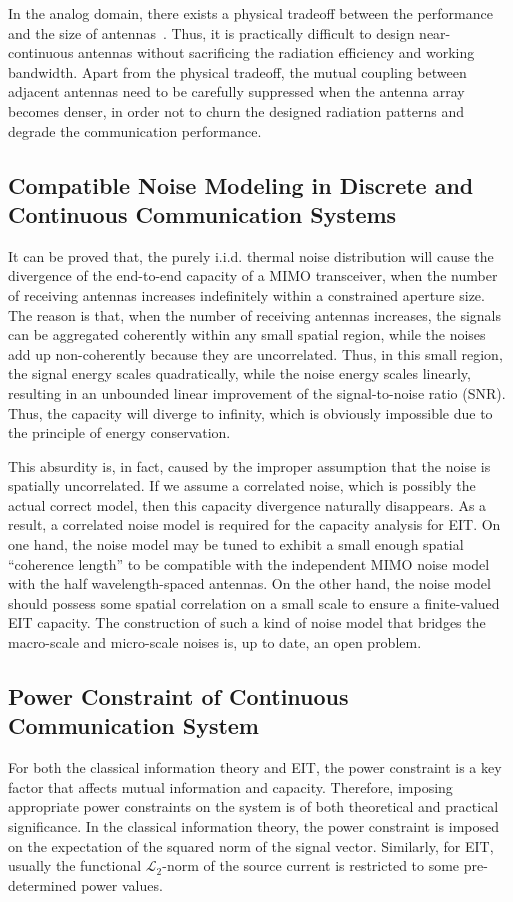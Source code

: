 \documentclass[journal,twocolumn]{IEEEtran}
\begin{document}
In the analog domain, there exists a physical tradeoff between the performance and the size of antennas~\cite{stratton2007electromagnetic}. Thus, it is practically difficult to design near-continuous antennas without sacrificing the radiation efficiency and working bandwidth. Apart from the physical tradeoff, the mutual coupling between adjacent antennas need to be carefully suppressed when the antenna array becomes denser, in order not to churn the designed radiation patterns and degrade the communication performance. 


\subsection{Compatible Noise Modeling in Discrete and Continuous Communication Systems}
It can be proved that, the purely i.i.d. thermal noise distribution will cause the divergence of the end-to-end capacity of a MIMO transceiver, when the number of receiving antennas increases indefinitely within a constrained aperture size. 
The reason is that, when the number of receiving antennas increases, the signals can be aggregated coherently within any small spatial region, while the noises add up non-coherently because they are uncorrelated. 
Thus, in this small region, the signal energy scales quadratically, while the noise energy scales linearly, resulting in an unbounded linear improvement of the signal-to-noise ratio (SNR). Thus, the capacity will diverge to infinity, which is obviously impossible due to the principle of energy conservation.  

This absurdity is, in fact, caused by the improper assumption that the noise is spatially uncorrelated. 
If we assume a correlated noise, which is possibly the actual correct model, then this capacity divergence naturally disappears. 
As a result, a correlated noise model is required for the capacity analysis for EIT. On one hand, the noise model may be tuned to exhibit a small enough spatial ``coherence length'' to be compatible with the independent MIMO noise model with the half wavelength-spaced antennas. On the other hand, the noise model should possess some spatial correlation on a small scale to ensure a finite-valued EIT capacity. 
The construction of such a kind of noise model that bridges the macro-scale and micro-scale noises is, up to date, an open problem. 

\vspace{-1em}
\subsection{Power Constraint of Continuous Communication System}
For both the classical information theory and EIT, the power constraint is a key factor that affects mutual information and capacity. 
Therefore, imposing appropriate power constraints on the system is of both theoretical and practical significance. 
In the classical information theory, the power constraint is imposed on the expectation of the squared norm of the signal vector.  
Similarly, for EIT, usually the functional $\mathcal{L}_2$-norm of the source current is restricted to some pre-determined power values.  
\end{document}
